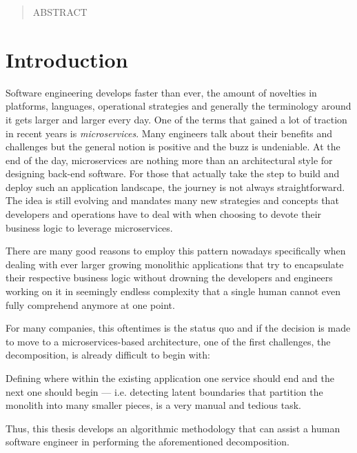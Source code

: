 \documentclass[12pt,a4paper]{report}
\begin{document}





\begin{abstract}

ABSTRACT

\end{abstract}




\tableofcontents




\chapter{Introduction} \label{chap:introduction}

Software engineering develops faster than ever, the amount of novelties in
platforms, languages, operational strategies and generally the terminology
around it gets larger and larger every day.
One of the terms that gained a lot of traction in recent years is \textit{microservices}.
Many engineers talk about their benefits and challenges but the general notion
is positive and the buzz is undeniable.
At the end of the day, microservices are nothing more than an architectural style
for designing back-end software.
For those that actually take the step to build and deploy such an application
landscape, the journey is not always straightforward.
The idea is still evolving and mandates many new strategies and concepts
that developers and operations have to deal with
when choosing to devote their business logic to leverage microservices.

There are many good reasons to employ this pattern nowadays specifically
when dealing with ever larger growing monolithic applications that try to
encapsulate their respective business logic without drowning the
developers and engineers working on it in seemingly endless complexity
that a single human cannot even fully comprehend anymore at one point.

For many companies, this oftentimes is the status quo and if the decision is
made to move to a microservices\hyp based architecture, one of the first
challenges, the decomposition, is already difficult to begin with:

Defining where within the existing application one service should end and the
next one should begin --- i.e. detecting latent boundaries that partition
the monolith into many smaller pieces, is a very manual and tedious task.

Thus, this thesis develops an algorithmic methodology that can assist
a human software engineer in performing the aforementioned decomposition.
\end{document}
